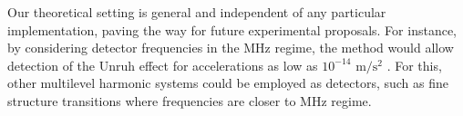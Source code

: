 Our theoretical setting is general and independent of any particular implementation, paving the way for future experimental proposals. For instance, by considering detector frequencies in the MHz regime,  the method would allow detection of the Unruh effect for accelerations as low as $10^{-14}$ $\text{m}/\text{s}^2$ . For this, other multilevel harmonic systems could be employed as detectors, such as fine structure transitions where frequencies are closer to MHz regime.




